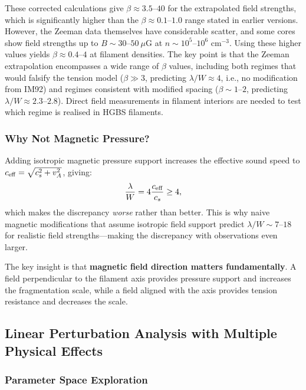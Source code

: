 \documentclass[11pt,a4paper]{article}
\begin{document}
These corrected calculations give $\beta \approx 3.5$--$40$ for the extrapolated field strengths, which is significantly higher than the $\beta \approx 0.1$--$1.0$ range stated in earlier versions. However, the Zeeman data themselves have considerable scatter, and some cores show field strengths up to $B \sim 30$--$50~\mu$G at $n \sim 10^5$--$10^6$ cm$^{-3}$. Using these higher values yields $\beta \approx 0.4$--$4$ at filament densities. The key point is that the Zeeman extrapolation encompasses a wide range of $\beta$ values, including both regimes that would falsify the tension model ($\beta \gg 3$, predicting $\lambda/W \approx 4$, i.e., no modification from IM92) and regimes consistent with modified spacing ($\beta \sim 1$--$2$, predicting $\lambda/W \approx 2.3$--$2.8$). Direct field measurements in filament interiors are needed to test which regime is realised in HGBS filaments.

\subsubsection{Why Not Magnetic Pressure?}

Adding isotropic magnetic pressure support increases the effective sound speed to $c_{\rm eff} = \sqrt{c_s^2 + v_A^2}$, giving:
\begin{equation}
\frac{\lambda}{W} = 4 \frac{c_{\rm eff}}{c_s} \geq 4,
\end{equation}
which makes the discrepancy \emph{worse} rather than better. This is why naive magnetic modifications that assume isotropic field support predict $\lambda/W \sim 7$--$18$ for realistic field strengths—making the discrepancy with observations even larger.

The key insight is that \textbf{magnetic field direction matters fundamentally}. A field perpendicular to the filament axis provides pressure support and increases the fragmentation scale, while a field aligned with the axis provides tension resistance and decreases the scale.

\subsection{Linear Perturbation Analysis with Multiple Physical Effects}

\subsubsection{Parameter Space Exploration}
\end{document}
